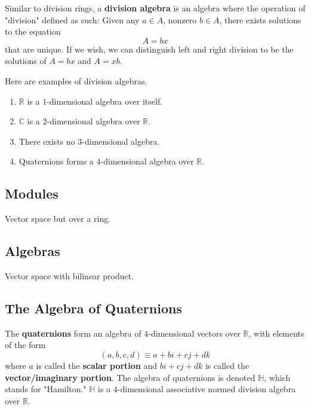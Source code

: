   \begin{definition}
    Similar to division rings, a \textbf{division algebra} is an algebra where the operation of "division" defined as such: Given any $a \in A$, nonzero $b \in A$, there exists solutions to the equation
    \begin{equation}
      A = bx
    \end{equation}
    that are unique. If we wish, we can distinguish left and right division to be the solutions of $A = b x$ and $A = x b$. 
  \end{definition}

  \begin{definition}
    Here are examples of division algebras.
    \begin{enumerate}
      \item $\mathbb{R}$ is a $1$-dimensional algebra over itself. 
      \item $\mathbb{C}$ is a $2$-dimensional algebra over $\mathbb{R}$. 
      \item There exists no $3$-dimensional algebra. 
      \item Quaternions forms a $4$-dimensional algebra over $\mathbb{R}$. 
    \end{enumerate}
  \end{definition}

\subsection{Modules}

  Vector space but over a ring. 

\subsection{Algebras}

  Vector space with bilinear product.  

\subsection{The Algebra of Quaternions}

  \begin{definition}
    The \textbf{quaternions} form an algebra of $4$-dimensional vectors over $\mathbb{R}$, with elements of the form
    \begin{equation}
      (a, b, c, d) \equiv a + bi + cj + dk
    \end{equation}
    where $a$ is called the \textbf{scalar portion} and $bi + cj + dk$ is called the \textbf{vector/imaginary portion}. The algebra of quaternions is denoted $\mathbb{H}$, which stands for "Hamilton." $\mathbb{H}$ is a $4$-dimensional associative normed division algebra over $\mathbb{R}$. 
  \end{definition}

